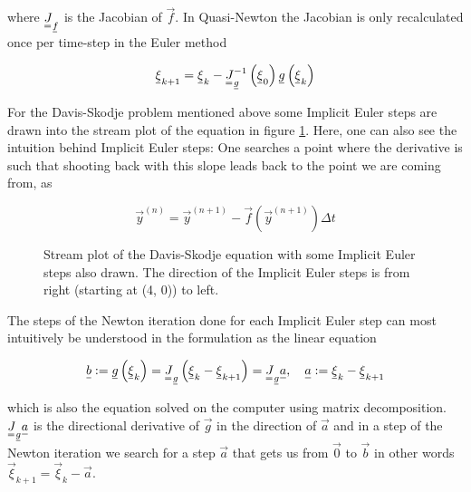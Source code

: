 where $\mat{J}_{\vec{f}}$ is the Jacobian of $\vec{f}$. In Quasi-Newton the Jacobian is only recalculated once per time-step in the Euler method

\[
  \vec{\xi}_{k+1} = \vec{\xi}_k - \mat{J}_{\vec{g}}^{-1} \left( \vec{\xi}_0 \right) \vec{g} \left( \vec{\xi}_k \right)
\]

For the Davis-Skodje problem mentioned above some Implicit Euler steps are drawn into the stream plot of the equation in figure \ref{fig:davis_skodje}. Here, one can also see the intuition behind Implicit Euler steps: One searches a point where the derivative is such that shooting back with this slope leads back to the point we are coming from, as

\[
  \vec{y}^{(n)} = \vec{y}^{(n+1)} - \vec{f} \left( \vec{y}^{(n+1)} \right) \Delta t
\]

\begin{figure}[!htb]
  \centering
  \hfill
  \caption{Stream plot of the Davis-Skodje equation with some Implicit Euler steps also drawn. The direction of the Implicit Euler steps is from right (starting at (4, 0)) to left.}
  \label{fig:davis_skodje}
\end{figure}

The steps of the Newton iteration done for each Implicit Euler step can most intuitively be understood in the formulation as the linear equation

\[
  \vec{b} := \vec{g} \left( \vec{\xi}_k \right) = \mat{J}_{\vec{g}} \left( \vec{\xi}_k - \vec{\xi}_{k+1} \right) = \mat{J}_{\vec{g}} \vec{a}, \quad \vec{a} := \vec{\xi}_k - \vec{\xi}_{k+1}
\]

which is also the equation solved on the computer using matrix decomposition. $\mat{J}_{\vec{g}} \vec{a}$ is the directional derivative of $\vec{g}$ in the direction of $\vec{a}$ and in a step of the Newton iteration we search for a step $\vec{a}$ that gets us from $\vec{0}$ to $\vec{b}$ in other words $\vec{\xi}_{k+1} = \vec{\xi}_{k} - \vec{a}$.


